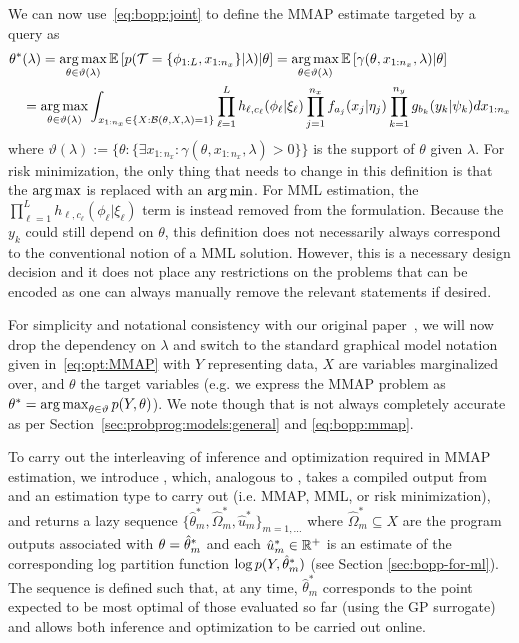We can now use~\eqref{eq:bopp:joint} to define the MMAP estimate targeted by a  query as
\begin{align}
\label{eq:bopp:mmap}
\begin{split}
\theta^*& (\lambda) = \operatorname*{arg\,max}_{\theta \in \vartheta (\lambda)} 
\mathbb{E} \left[p(\mathcal{T} = \{\phi_{1:L},x_{1:n_x}\} | \lambda) \middle| \theta \right]
= \operatorname*{arg\,max}_{\theta \in \vartheta (\lambda)} 
\mathbb{E} \left[\gamma(\theta,x_{1:n_x}, \lambda) \middle| \theta \right] \\
& = \operatorname*{arg\,max}_{\theta \in \vartheta (\lambda)} 
\int_{x_{1:n_x} \in \{X : \mathcal{B}(\theta,X,\lambda)=1\}} 
\prod_{\ell=1}^{L} h_{\ell,c_{\ell}} (\phi_{\ell} | \xi_{\ell})
\prod_{j=1}^{n_x} f_{a_j}(x_j | \eta_j) \prod_{k=1}^{n_y} g_{b_k}(y_k | \psi_k) dx_{1:n_x}
\end{split}
\end{align}
where $\vartheta (\lambda) := \{\theta : \{\exists x_{1:n_x} : \gamma(\theta,x_{1:n_x},\lambda)>0\}\}$
is the support of $\theta$ given $\lambda$.  For risk minimization, the only thing that
needs to change in this definition is that the $\operatorname*{arg\,max}$ is replaced with an $\operatorname*{arg\,min}$.
For MML estimation, the $\prod_{\ell=1}^{L} h_{\ell,c_{\ell}} (\phi_{\ell} | \xi_{\ell})$
term is instead removed from the formulation.  Because the $y_k$ could still depend on $\theta$,
this definition does not necessarily always correspond to the conventional notion of a MML solution.
However, this is a necessary design decision and it does not place any restrictions on the 
problems that can be encoded as one can always manually remove the relevant 
\observe statements if desired.

For simplicity and notational consistency with our original paper~\citep{rainforth2016nips}, 
we will now drop the dependency on $\lambda$ and switch to
the standard graphical model notation given in~\eqref{eq:opt:MMAP}
with $Y$ representing data, $X$ are variables marginalized over, and $\theta$ the target variables
(e.g. we express the MMAP problem as $\theta^* = \operatorname*{arg\,max}_{\theta \in \vartheta}
p(Y,\theta)$).
We note though that
is not always completely accurate as per Section~\ref{sec:probprog:models:general} and 
\eqref{eq:bopp:mmap}.

To carry out the interleaving of inference and optimization required in MMAP estimation, we
introduce \doopt, which, analogous to \doquery, takes a compiled output from  and
an estimation type to carry out (i.e. MMAP, MML, or risk minimization), and
returns a lazy sequence $\{\hat{\theta}^*_m,\hat{\Omega}^*_m,\hat{u}^*_m\}_{m=1,\dots}$
where $\hat{\Omega}^*_m \subseteq X$ are the program outputs associated with
$\theta=\hat{\theta}^*_m$ and each $\hat{u}^*_m \in \mathbb{R}^+$ is an estimate of the corresponding
log partition function $\log p(Y, \hat{\theta}_m^*)$ (see Section \ref{sec:bopp-for-ml}).  The
sequence is
defined such that, at any time, $\hat{\theta}^*_m$ corresponds to the point expected to be
most optimal of those evaluated so far (using the GP surrogate) and allows both inference and optimization to be
carried out online.
